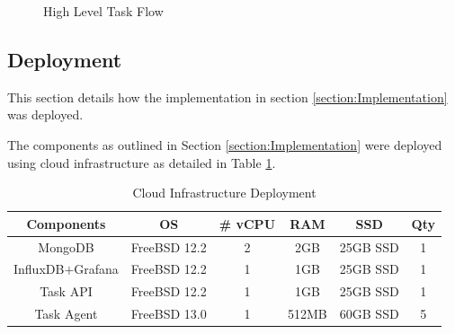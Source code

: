 \documentclass{mscreport}
\begin{document}

\begin{figure}[p]
	\begin{center}
		\caption{High Level Task Flow}
		\label{fig:task_flow}
	\end{center}
\end{figure}

\clearpage
\newpage

\subsection{Deployment}

This section details how the implementation in section \ref{section:Implementation} was deployed.

\vspace{0.3cm} \noindent
The components as outlined in Section \ref{section:Implementation} were deployed using cloud infrastructure as detailed in Table \ref{table:implmentation_cloud}.

\begin{table}[H]
  \begin{center}
    \begin{tabular}{|c|c|c|c|c|c|}  %
      \hline
      \textbf{Components} & \textbf{OS} & \textbf{\# vCPU} & \textbf{RAM} & \textbf{SSD} & \textbf{Qty}\\
      \hline
      MongoDB & FreeBSD 12.2 & 2 & 2GB & 25GB SSD & 1 \\
      \hline
      InfluxDB$+$Grafana & FreeBSD 12.2 & 1 & 1GB & 25GB SSD & 1 \\
      \hline
      Task API & FreeBSD 12.2 & 1 & 1GB & 25GB SSD & 1 \\
      \hline
      Task Agent & FreeBSD 13.0 & 1 & 512MB & 60GB SSD & 5 \\
      \hline
    \end{tabular}
    \caption{Cloud Infrastructure Deployment}
    \label{table:implmentation_cloud} %
  \end{center}
\end{table}
\end{document}
